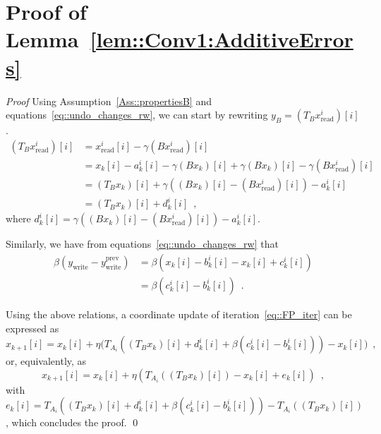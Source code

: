 \documentclass[envcountsect]{svjour3}
\begin{document}
\section{Proof of Lemma~\ref{lem::Conv1:AdditiveErrors} }{\label{app::Conv1:AdditiveError}}
{\it Proof}  Using Assumption~\ref{Ass::propertiesB} and equations~\eqref{eq::undo_changes_rw}, we can start by rewriting $y_B=(T_B x^i_\mathrm{read})[i]$.
\begin{align*}
 (T_B x^i_\mathrm{read})[i] &= x^i_\mathrm{read}[i] - \gamma (Bx^i_\mathrm{read})[i] \\
                     &= x_{k}[i] - a_k^i[i] - \gamma (Bx_{k})[i] + \gamma (Bx_{k})[i] - \gamma (Bx^i_\mathrm{read})[i] \\
                     &= (T_Bx_k)[i] + \gamma \left((Bx_{k})[i]-(Bx^i_\mathrm{read})[i]\right) - a_k^i[i] \\
                     &= (T_Bx_k)[i] + d_k^i[i]\enspace,
\end{align*}
where $d_k^i[i]=\gamma \left((Bx_{k})[i]-(Bx^i_\mathrm{read})[i]\right) - a_k^i[i]$.

Similarly, we have from equations~\eqref{eq::undo_changes_rw} that
\begin{align*}
 \beta ( y_\mathrm{write} - y_\mathrm{write}^\mathrm{prev} ) &= \beta ( x_k[i] - b_k^i[i] - x_k[i] + c_k^i[i] ) \\
                     &= \beta (c_k^i[i] - b_k^i[i])\enspace.
\end{align*}

Using the above relations, a coordinate update of iteration~\eqref{eq::FP_iter} can be expressed as
\begin{equation*}
x_{k+1}[i] = x_k[i] + \eta \Big(T_{A_{i}} \left( (T_B x_k)[i] + d_k^i[i] + \beta (c_k^i[i] - b_k^i[i]) \right) - x_k[i] \Big)\enspace,
\end{equation*}
or, equivalently, as
\begin{equation*}
x_{k+1}[i] = x_k[i] + \eta \left( T_{A_{i}}((T_B x_k)[i]) - x_k[i] + e_k[i]\right)\enspace,
\end{equation*}
with $e_k[i] = T_{A_{i}}\left((T_Bx_k)[i] + d_k^i[i] + \beta(c_k^i[i]-b_k^i[i])\right) - T_{A_{i}}((T_Bx_k)[i])$, which concludes the proof.
\qed
\end{document}
